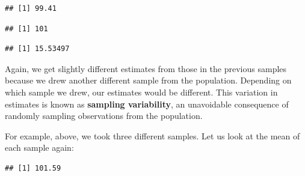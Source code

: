 \documentclass[
]{book}
\newenvironment{Shaded}{\begin{snugshade}}{\end{snugshade}}
\newcommand{\CommentTok}[1]{\textcolor[rgb]{0.56,0.35,0.01}{\textit{#1}}}
\newcommand{\FunctionTok}[1]{\textcolor[rgb]{0.00,0.00,0.00}{#1}}
\newcommand{\NormalTok}[1]{#1}
\newcommand{\SpecialCharTok}[1]{\textcolor[rgb]{0.00,0.00,0.00}{#1}}
\begin{document}
\begin{verbatim}
## [1] 99.41
\end{verbatim}

\begin{Shaded}
\end{Shaded}

\begin{verbatim}
## [1] 101
\end{verbatim}

\begin{Shaded}
\end{Shaded}

\begin{verbatim}
## [1] 15.53497
\end{verbatim}

Again, we get slightly different estimates from those in the previous samples because we drew another different sample from the population. Depending on which sample we drew, our estimates would be different. This variation in estimates is known as \textbf{sampling variability}, an unavoidable consequence of randomly sampling observations from the population.

For example, above, we took three different samples. Let us look at the mean of each sample again:

\begin{Shaded}
\end{Shaded}

\begin{verbatim}
## [1] 101.59
\end{verbatim}

\begin{Shaded}
\end{Shaded}
\end{document}
